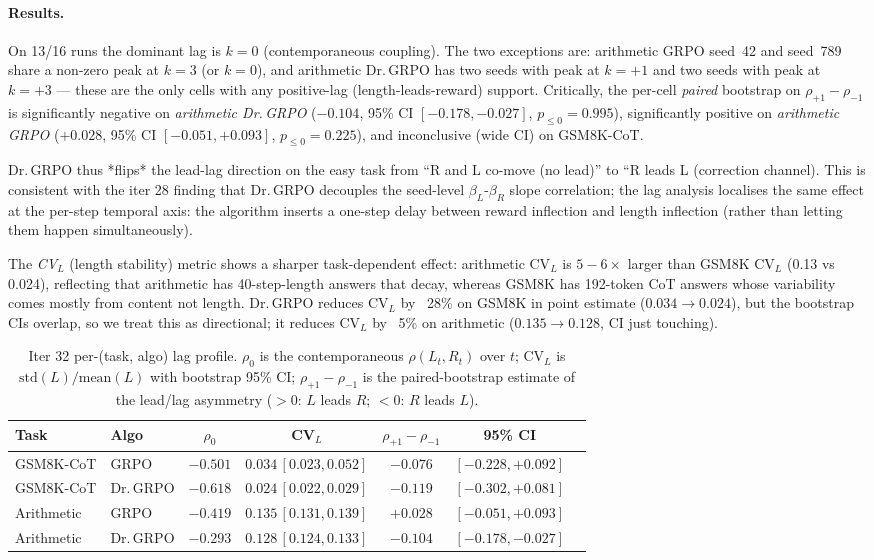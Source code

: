 \paragraph{Results.}
On 13/16 runs the dominant lag is $k{=}0$ (contemporaneous coupling).
The two exceptions are: arithmetic GRPO seed~42 and seed~789 share a
non-zero peak at $k{=}3$ (or $k{=}0$), and arithmetic Dr.\,GRPO has two
seeds with peak at $k{=}{+}1$ and two seeds with peak at $k{=}{+}3$
--- these are the only cells with any positive-lag (length-leads-reward)
support. Critically, the per-cell \emph{paired} bootstrap on
$\rho_{+1} - \rho_{-1}$ is significantly negative on \emph{arithmetic
Dr.\,GRPO} ($-0.104$, 95\% CI $[-0.178, -0.027]$, $p_{\le 0}{=}0.995$),
significantly positive on \emph{arithmetic GRPO} ($+0.028$, 95\% CI
$[-0.051, +0.093]$, $p_{\le 0}{=}0.225$), and inconclusive (wide CI) on
GSM8K-CoT.

Dr.\,GRPO thus *flips* the lead-lag direction on the easy task from
``R and L co-move (no lead)'' to ``R leads L (correction channel).
This is consistent with the iter 28 finding that Dr.\,GRPO decouples
the seed-level $\beta_L$-$\beta_R$ slope correlation; the lag analysis
localises the same effect at the per-step temporal axis: the algorithm
inserts a one-step delay between reward inflection and length
inflection (rather than letting them happen simultaneously).

The \emph{CV}$_L$ (length stability) metric shows a sharper task-dependent
effect: arithmetic CV$_L$ is $5{-}6\times$ larger than GSM8K CV$_L$
(0.13 vs 0.024), reflecting that arithmetic has 40-step-length answers
that decay, whereas GSM8K has 192-token CoT answers whose variability
comes mostly from content not length. Dr.\,GRPO reduces CV$_L$ by
~28\% on GSM8K in point estimate ($0.034 \to 0.024$), but the bootstrap
CIs overlap, so we treat this as directional; it reduces CV$_L$ by ~5\% on
arithmetic ($0.135 \to 0.128$, CI just touching).

\begin{table}[htbp]
\centering\small
\caption{Iter 32 per-(task, algo) lag profile. $\rho_0$ is the
contemporaneous $\rho(L_t,R_t)$ over $t$; CV$_L$ is $\mathrm{std}(L)/\mathrm{mean}(L)$
with bootstrap 95\% CI; $\rho_{+1}{-}\rho_{-1}$ is the paired-bootstrap
estimate of the lead/lag asymmetry ($>0$: $L$ leads $R$; $<0$: $R$
leads $L$).}
\label{tab:length-bias-iter32}
\begin{tabular}{llccccc}
\hline
Task & Algo & $\rho_0$ & CV$_L$ & $\rho_{+1}{-}\rho_{-1}$ & 95\% CI \\
\hline
GSM8K-CoT & GRPO & $-0.501$ & $0.034\,[0.023,0.052]$ & $-0.076$ & $[-0.228,+0.092]$ \\
GSM8K-CoT & Dr.\,GRPO & $-0.618$ & $0.024\,[0.022,0.029]$ & $-0.119$ & $[-0.302,+0.081]$ \\
Arithmetic & GRPO & $-0.419$ & $0.135\,[0.131,0.139]$ & $+0.028$ & $[-0.051,+0.093]$ \\
Arithmetic & Dr.\,GRPO & $-0.293$ & $0.128\,[0.124,0.133]$ & $-0.104$ & $[-0.178,-0.027]$ \\
\hline
\end{tabular}
\end{table}

